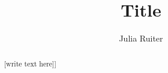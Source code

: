 \documentclass[a4paper,11pt,twoside]{UUthesis}
\title{Title}
\author{Julia Ruiter}
\theoremstyle{definition}
\theoremstyle{remark}
\begin{document}

\frontmatter

\maketitle %
%
%
%
\begin{abstract} 
[write text here]]
\end{abstract}

\tableofcontents
\listoffigures




\mainmatter







\backmatter

%
\nocite{*} %


\end{document}
